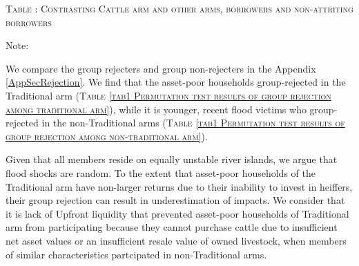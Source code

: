 \begin{table}
\vspace{3ex}
\hfil\begin{minipage}[t]{14cm}
\hfil\textsc{\normalsize Table \thetable: Contrasting \textsf{Cattle} arm and other arms, borrowers and non-attriting borrowers\label{tab main cownoncow}}\\
\setlength{\tabcolsep}{1pt}
\setlength{\baselineskip}{8pt}
\renewcommand{\arraystretch}{.55}
\hfil
\vspace{2ex}
\end{minipage}

\hfil{\footnotesize Note:} 
\end{table}

	We compare the group rejecters and group non-rejecters in the Appendix \ref{AppSecRejection}. We find that the asset-poor households group-rejected in the \textsf{Traditional} arm (\textsc{\normalsize Table \ref{tab1 Permutation test results of group rejection among traditional arm}}), while it is younger, recent flood victims who group-rejected in the non-\textsf{Traditional} arms (\textsc{\normalsize Table \ref{tab1 Permutation test results of group rejection among non-traditional arm}}).  %

	Given that all members reside on equally unstable river islands, we argue that flood shocks are random.  To the extent that asset-poor households of the \textsf{Traditional} arm have non-larger returns due to their inability to invest in heiffers, their group rejection can result in underestimation of impacts. We consider that it is lack of \textsf{Upfront} liquidity that prevented asset-poor households of \textsf{Traditional} arm from participating because they cannot purchase cattle due to insufficient net asset values or an insufficient resale value of owned livestock, when members of similar characteristics partcipated in non-\textsf{Traditional} arms. 

